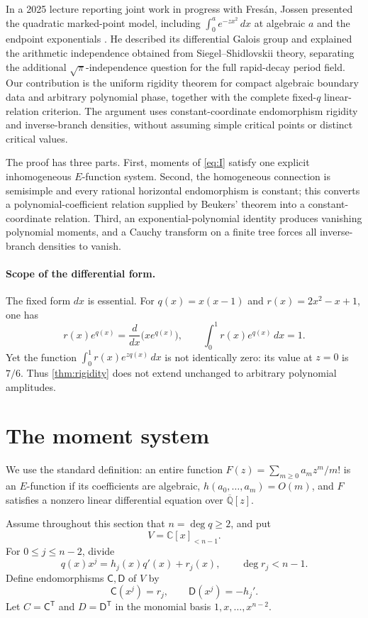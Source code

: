 \documentclass[11pt]{article}
\numberwithin{equation}{section}
\theoremstyle{definition}
\theoremstyle{remark}
\newcommand{\C}{\mathbb C}
\newcommand{\Qbar}{\overline{\mathbb Q}}
\begin{document}
In a 2025 lecture reporting joint work in progress with Fres\'an, Jossen
presented the quadratic marked-point model, including
$\int_0^a e^{-zx^2}\,dx$ at algebraic $a$ and the endpoint exponentials
\cite{Jossen2025}.  He described its differential Galois group and explained
the arithmetic independence obtained from Siegel--Shidlovskii theory,
separating the additional $\sqrt\pi$-independence question for the full
rapid-decay period field.  Our contribution is the uniform rigidity theorem
for compact algebraic boundary data and arbitrary polynomial phase, together
with the complete fixed-$q$ linear-relation criterion.  The argument uses
constant-coordinate endomorphism rigidity and inverse-branch densities,
without assuming simple critical points or distinct critical values.

The proof has three parts.  First, moments of \eqref{eq:I} satisfy one
explicit inhomogeneous $E$-function system.  Second, the homogeneous
connection is semisimple and every rational horizontal endomorphism is
constant; this converts a polynomial-coefficient relation supplied by
Beukers' theorem into a constant-coordinate relation.  Third, an
exponential-polynomial identity produces vanishing polynomial moments, and
a Cauchy transform on a finite tree forces all inverse-branch densities to
vanish.

\paragraph{Scope of the differential form.}
The fixed form $dx$ is essential.  For $q(x)=x(x-1)$ and
$r(x)=2x^2-x+1$, one has
\[
  r(x)e^{q(x)}=\frac{d}{dx}\bigl(xe^{q(x)}\bigr),
  \qquad \int_0^1 r(x)e^{q(x)}\,dx=1.
\]
Yet the function $\int_0^1 r(x)e^{zq(x)}\,dx$ is not identically zero:
its value at $z=0$ is $7/6$.  Thus \cref{thm:rigidity} does not extend
unchanged to arbitrary polynomial amplitudes.

\section{The moment system}

We use the standard definition: an entire function
$F(z)=\sum_{m\ge0}a_m z^m/m!$ is an $E$-function if its coefficients are
algebraic, $h(a_0,\ldots,a_m)=O(m)$, and $F$ satisfies a nonzero linear
differential equation over $\Qbar[z]$.

Assume throughout this section that $n=\deg q\ge2$, and put
\[
  V=\C[x]_{<n-1}.
\]
For $0\le j\le n-2$, divide
\begin{equation}\label{eq:division}
  q(x)x^j=h_j(x)q'(x)+r_j(x),
  \qquad \deg r_j<n-1.
\end{equation}
Define endomorphisms $\mathsf C,\mathsf D$ of $V$ by
\[
  \mathsf C(x^j)=r_j,
  \qquad
  \mathsf D(x^j)=-h_j'.
\]
Let $C=\mathsf C^{\mathsf T}$ and $D=\mathsf D^{\mathsf T}$ in the
monomial basis $1,x,\ldots,x^{n-2}$.
\end{document}
